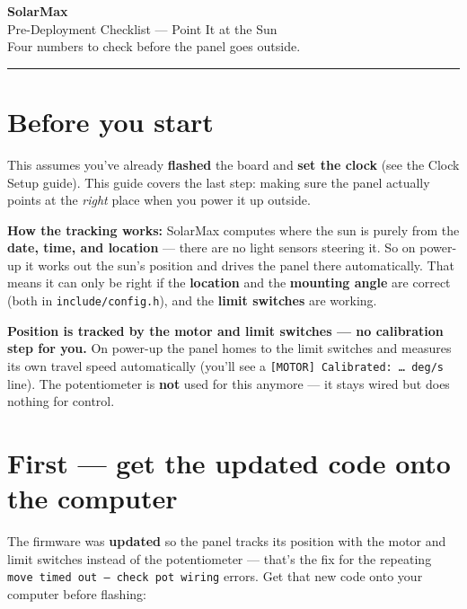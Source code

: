 \documentclass[11pt]{article}
\begin{document}
\begin{center}
{\Huge\bfseries\color{brandblue} SolarMax}\\[4pt]
{\LARGE Pre-Deployment Checklist --- Point It at the Sun}\\[8pt]
{\large Four numbers to check before the panel goes outside.}\\[6pt]
\rule{0.9\linewidth}{0.8pt}
\end{center}

\vspace{4pt}
\tableofcontents
\vspace{8pt}

\section{Before you start}
This assumes you've already \textbf{flashed} the board and \textbf{set the clock}
(see the Clock Setup guide). This guide covers the last step: making sure the panel
actually points at the \emph{right} place when you power it up outside.

\begin{note}
\textbf{How the tracking works:} SolarMax computes where the sun is purely from the
\textbf{date, time, and location} --- there are no light sensors steering it. So on
power-up it works out the sun's position and drives the panel there automatically.
That means it can only be right if the \textbf{location} and the \textbf{mounting
angle} are correct (both in \texttt{include/config.h}), and the \textbf{limit
switches} are working.
\end{note}

\begin{note}
\textbf{Position is tracked by the motor and limit switches --- no calibration step
for you.} On power-up the panel homes to the limit switches and measures its own
travel speed automatically (you'll see a \texttt{[MOTOR] Calibrated:\ \ldots\ deg/s}
line). The potentiometer is \textbf{not} used for this anymore --- it stays wired but
does nothing for control.
\end{note}

\section{First --- get the updated code onto the computer}
The firmware was \textbf{updated} so the panel tracks its position with the motor and
limit switches instead of the potentiometer --- that's the fix for the repeating
\texttt{move timed out --- check pot wiring} errors. Get that new code onto your
computer before flashing:
\end{document}
